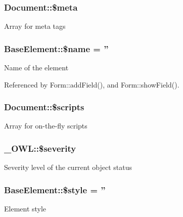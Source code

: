 \subsubsection[{\$meta}]{\setlength{\rightskip}{0pt plus 5cm}Document::\$meta}\label{classDocument_a4b2a3fc78ec084611daef3343dca3756}
Array for meta tags 
\subsubsection[{\$name}]{\setlength{\rightskip}{0pt plus 5cm}BaseElement::\$name = ''}\label{classBaseElement_a30b8cff187a9de659a70daf287d66f45}
Name of the element 

Referenced by Form::addField(), and Form::showField().

\subsubsection[{\$scripts}]{\setlength{\rightskip}{0pt plus 5cm}Document::\$scripts}\label{classDocument_a011e1486a1c78776019df42ed652f6f0}
Array for on-\/the-\/fly scripts 
\subsubsection[{\$severity}]{\setlength{\rightskip}{0pt plus 5cm}\_\-OWL::\$severity}\label{class__OWL_ad26b40a9dbbacb33e299b17826f8327c}
Severity level of the current object status 
\subsubsection[{\$style}]{\setlength{\rightskip}{0pt plus 5cm}BaseElement::\$style = ''}\label{classBaseElement_a429a3d642dd95f30e1059ef29564b87d}
Element style 
